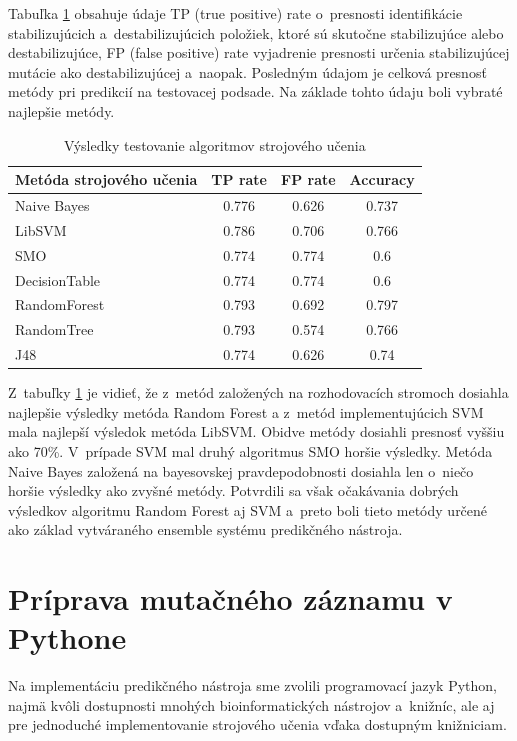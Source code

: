 Tabuľka \ref{testovanie} obsahuje údaje TP (true positive) rate o~presnosti identifikácie stabilizujúcich a~destabilizujúcich položiek, ktoré sú skutočne stabilizujúce alebo destabilizujúce, FP (false positive) rate vyjadrenie presnosti určenia stabilizujúcej mutácie ako destabilizujúcej a~naopak. Posledným údajom je celková presnosť metódy pri predikcií na testovacej podsade. Na základe tohto údaju boli vybraté najlepšie metódy.

\begin{table}[H]
	\centering
	\begin{tabular}{ | l | c | c | c| }
		\hline 
		Metóda strojového učenia & TP rate & FP rate & Accuracy \\ \hline
		Naive Bayes & 0.776 & 0.626 & 0.737 \\ \hline
		LibSVM &  0.786   & 0.706   & 0.766  \\ \hline
		SMO & 0.774 & 0.774 & 0.6\\ \hline
		DecisionTable & 0.774 & 0.774 & 0.6\\ \hline
		RandomForest & 0.793 & 0.692 & 0.797\\ \hline
		RandomTree & 0.793 & 0.574 & 0.766\\ \hline
		J48 & 0.774 & 0.626 & 0.74\\ \hline		
	\end{tabular}
	\caption {Výsledky testovanie algoritmov strojového učenia} \label{testovanie} 
\end{table}

Z~tabuľky \ref{testovanie} je vidieť, že z~metód založených na rozhodovacích stromoch dosiahla najlepšie výsledky metóda Random Forest a z~metód implementujúcich SVM mala najlepší výsledok metóda LibSVM. Obidve metódy dosiahli presnosť vyššiu ako 70\%. V~prípade SVM mal druhý algoritmus SMO horšie výsledky. Metóda Naive Bayes založená na bayesovskej pravdepodobnosti dosiahla len o~niečo horšie výsledky ako zvyšné metódy. Potvrdili sa však očakávania dobrých výsledkov algoritmu Random Forest aj SVM a~preto boli tieto metódy určené ako základ vytváraného ensemble systému predikčného nástroja.

\section{Príprava mutačného záznamu v Pythone}

Na implementáciu predikčného nástroja sme zvolili programovací jazyk Python, najmä kvôli dostupnosti mnohých bioinformatických nástrojov a~knižníc, ale aj pre jednoduché implementovanie strojového učenia vďaka dostupným knižniciam.

